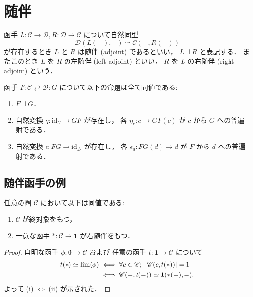 \documentclass[titlepage]{ltjsreport}
\newcommand{\cat}[1]{\mathscr{#1}}
\newcommand{\obj}[1]{\lowercase{#1}}
\newcommand{\objs}[1]{#1}
\newcommand{\mrp}[3]{{#1}:{#2}\to{#3}}
\newcommand{\mrps}[3]{#1(#2,#3)}
\newcommand{\id}[1]{\mathrm{id}_{#1}}
\begin{document}
\section{随伴}

\begin{definition}[随伴]
  \def\C{\cat{C}}%
  \def\D{\cat{D}}%
  \def\L{L}%
  \def\R{R}%
  函手 $\mrp{\L}{\C}{\D},\mrp{\R}{\D}{\C}$ について自然同型
  \begin{equation}
    \mrps{\D}{\L(-)}{-}\simeq\mrps{\C}{-}{\R(-)}
  \end{equation}
  が存在するとき $\L$ と $\R$ は随伴 (adjoint) であるといい，
  $\L\dashv\R$ と表記する．
  またこのとき $\L$ を $\R$ の左随伴 (left adjoint) といい，
  $\R$ を $\L$ の右随伴 (right adjoint) という．
\end{definition}

\begin{theorem}[随伴函手の並列定義]\label{thm:adjoint-functor-definitions}
  函手 $F:\cat{C}\rightleftarrows\cat{D}:G$ について以下の命題は全て同値である:
  \begin{enumerate}
    \item $F\dashv G$．
    \item 自然変換 $\eta:\id{\cat{C}}\to GF$ が存在し，
          各 $\eta_c:c\to GF(c)$ が $c$ から $G$ への普遍射である．
    \item 自然変換 $\epsilon:FG\to\id{\cat{D}}$ が存在し，
          各 $\epsilon_d:FG(d)\to d$ が $F$ から $d$ への普遍射である．
  \end{enumerate}
\end{theorem}

\subsection{随伴函手の例}

{
  \def\C{\cat{C}}%
  \begin{theorem}[終対象]
    任意の圏 $\C$ において以下は同値である:
    \begin{enumerate}[label=(\roman*)] %
      \item $\C$ が終対象をもつ，
      \item 一意な函手 $*:\C\to\mathbf{1}$ が右随伴をもつ．
    \end{enumerate}
  \end{theorem}
  \begin{proof}
    \def\c{\obj{c}}%
    自明な函手 $\mrp{\phi}{\mathbf{0}}{\C}$ および
    任意の函手 $t:\mathbf{1}\to\C$ について
    \begin{align} %
      t(*)\simeq\lim(\phi)
       & \iff\forall\c\in\objs{\C};
      \ |\mrps{\C}{c}{t(*)}|=1                                   \\
       & \iff\mrps{\C}{-}{t(-)}\simeq\mrps{\mathbf{1}}{*(-)}{-}.
    \end{align}
    よって (i) $\Leftrightarrow$ (ii) が示された．
  \end{proof}
}
\end{document}
